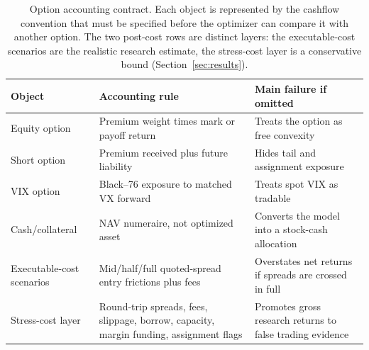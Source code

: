 \begin{table}[H]
\centering
\scriptsize
\begin{tabularx}{0.96\textwidth}{L{1.25in}L{1.85in}X}
\toprule
Object & Accounting rule & Main failure if omitted \\
\midrule
Equity option & Premium weight times mark or payoff return & Treats the option as free convexity \\
Short option & Premium received plus future liability & Hides tail and assignment exposure \\
VIX option & Black--76 exposure to matched VX forward & Treats spot VIX as tradable \\
Cash/collateral & NAV numeraire, not optimized asset & Converts the model into a stock-cash allocation \\
Executable-cost scenarios & Mid/half/full quoted-spread entry frictions plus fees & Overstates net returns if spreads are crossed in full \\
Stress-cost layer & Round-trip spreads, fees, slippage, borrow, capacity, margin funding, assignment flags & Promotes gross research returns to false trading evidence \\
\bottomrule
\end{tabularx}
\caption{Option accounting contract. Each object is represented by the cashflow convention
that must be specified before the optimizer can compare it with another option. The two
post-cost rows are distinct layers: the executable-cost scenarios are the realistic
research estimate, the stress-cost layer is a conservative bound
(Section~\ref{sec:results}).}
\label{tab:option_accounting_contract}
\end{table}
